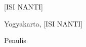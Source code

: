 [ISI NANTI]
\newline

\begin{flushright}
Yogyakarta, [ISI NANTI]
\end{flushright}
\vspace{0.5cm}
\begin{flushright}
Penulis
\end{flushright}
